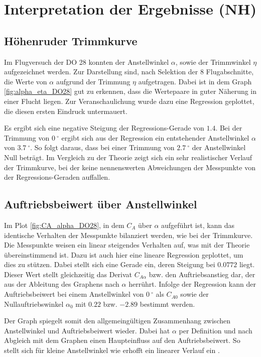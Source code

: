 \chapter{Interpretation der Ergebnisse (NH)}

\section{Höhenruder Trimmkurve}

Im Flugversuch der DO 28 konnten der Anstellwinkel $\alpha$, sowie der Trimmwinkel $\eta$ aufgezeichnet werden. Zur Darstellung sind, nach Selektion der 8 Flugabschnitte, die Werte von $\alpha$ aufgrund der Trimmung $\eta$ aufgetragen. Dabei ist in dem Graph \ref{fig:alpha_eta_DO28} gut zu erkennen, dass die Wertepaare in guter Näherung in einer Flucht liegen. Zur Veranschaulichung wurde dazu eine Regression geplottet, die diesen ersten Eindruck untermauert.  

Es ergibt sich eine negative Steigung der Regressions-Gerade von $1.4$. Bei der Trimmung von $0 \ ^{\circ}$ ergibt sich aus der Regression ein entstehender Anstellwinkel $\alpha$ von $3.7 \ ^{\circ}$. So folgt daraus, dass bei einer Trimmung von $2.7 \ ^{\circ}$ der Anstellwinkel Null beträgt. Im Vergleich zu der Theorie zeigt sich ein sehr realistischer Verlauf der Trimmkurve, bei der keine nennenswerten Abweichungen der Messpunkte von der Regressions-Geraden auffallen.

\section{Auftriebsbeiwert über Anstellwinkel}

Im Plot \ref{fig:CA_alpha_DO28}, in dem $C_A$ über $\alpha$ aufgeführt ist, kann das identische Verhalten der Messpunkte bilanziert werden, wie bei der Trimmkurve. Die Messpunkte weisen ein linear steigendes Verhalten auf, was mit der Theorie übereinstimmend ist. Dazu ist auch hier eine lineare Regression geplottet, um dies zu stützen. Dabei stellt sich eine Gerade ein, deren Steigung bei $0.0772$ liegt. Dieser Wert stellt gleichzeitig das Derivat $C_{A\alpha}$ bzw. den Auftriebsanstieg dar, der aus der Ableitung des Graphens nach $\alpha$ herrührt. Infolge der Regression kann der Auftriebsbeiwert bei einem Anstellwinkel von $0 \ ^{\circ}$ als $C_{A0}$ sowie der Nullauftriebswinkel $\alpha_0$ mit $0.22$ bzw. $-2.89$ bestimmt werden.

Der Graph spiegelt somit den allgemeingültigen Zusammenhang zwischen Anstellwinkel und Auftriebsbeiwert wieder. Dabei hat $\alpha$ per Definition und nach Abgleich mit dem Graphen einen Haupteinfluss auf den Auftriebsbeiwert. So stellt sich für kleine Anstellwinkel wie erhofft ein linearer Verlauf ein \cite{Skript}.


